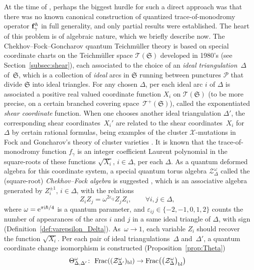 \documentclass[10pt,a4paper]{amsart}
\numberwithin{equation}{section}
\theoremstyle{definition}
\begin{document}
At the time of \cite{F97, CF, FG09}, perhaps the biggest hurdle for such a direct approach was that there was no known canonical construction of quantized trace-of-monodromy operator ${\bf f}^\hbar_\gamma$ in full generality, and only partial results were established. The heart of this problem is of algebraic nature, which we briefly describe now. The Chekhov--Fock--Goncharov quantum Teichm\"uller theory is based on special coordinate charts on the Teichm\"uller space $\mathscr{T}(\mathfrak{S})$ developed in 1980's \cite{F93,F97,P12, Thurston, Thurston86} (see Section~\ref{subsec:shear}), each associated to the choice of an {\em ideal triangulation}~$\Delta$ of~$\mathfrak{S}$, which is a collection of {\em ideal} arcs in $\mathfrak{S}$ running between punctures $\mathcal{P}$ that divide $\mathfrak{S}$ into ideal triangles. For any chosen $\Delta$, per each ideal arc $i$ of $\Delta$ is associated a positive real valued coordinate function $X_i$ on $\mathscr{T}(\mathfrak{S})$ (to be more precise, on a certain branched covering space~$\mathscr{T}^+(\mathfrak{S})$), called the exponentiated {\em shear coordinate} function. When one chooses another ideal triangulation $\Delta'$, the corresponding shear coordinates~$X_i'$ are related to the shear coordinates~$X_i$ for~$\Delta$ by certain rational formulas, being examples of the cluster $\mathscr{X}$-mutations in Fock and Goncharov's theory of cluster varieties \cite{F97, FG06, FG09}. It is known that the trace-of-monodromy function $f_\gamma$ is an integer coefficient Laurent polynomial in the square-roots of these functions $\sqrt{X_i}$, $i\in \Delta$, per each $\Delta$. As a quantum deformed algebra for this coordinate system, a special quantum torus algebra $\mathcal{Z}^\omega_\Delta$ called the (square-root) {\it Chekhov--Fock algebra} is suggested \cite{BL07, BW, FG09, Hiatt, Liu}, which is an associative algebra generated by $Z_i^{\pm 1}$, $i \in \Delta$, with the relations
\[
Z_i Z_j = \omega^{2\varepsilon_{ij}} Z_j Z_i, \qquad \forall i, j \in \Delta,
\]
where $\omega = {\rm e}^{\pi {\rm i} \hbar/4}$ is a quantum parameter, and $\varepsilon_{ij} \in \{-2,-1,0,1,2\}$ counts the number of appearances of the arcs $i$ and $j$ in a same ideal triangle of $\Delta$, with sign (Definition~\ref{def:varepsilon_Delta}). As~$\omega\to1$, each variable $Z_i$ should recover the function $\sqrt{X_i}$. Per each pair of ideal triangulations~$\Delta$ and~$\Delta'$, a quantum coordinate change isomorphism is constructed (Proposition~\ref{prop:Theta})
\[
\Theta^\omega_{\Delta,\Delta'} \colon \ {\rm Frac}( (\mathcal{Z}^\omega_{\Delta'})_{\rm bl} ) \to {\rm Frac}\bigl( \bigl(\mathcal{Z}^\omega_\Delta\bigr)_{\rm bl}\bigr)
\]
\end{document}
